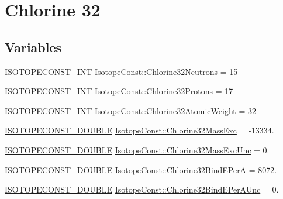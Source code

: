 \hypertarget{group___isotope_const-_chlorine-_cl32}{}\section{Chlorine 32}
\label{group___isotope_const-_chlorine-_cl32}
\subsection*{Variables}
\begin{DoxyCompactItemize}
\item 
\mbox{\hyperlink{group___isotope_const-_macros_ga5f18360b3e99483a35c32d789e62621c}{I\+S\+O\+T\+O\+P\+E\+C\+O\+N\+S\+T\+\_\+\+I\+NT}} \mbox{\hyperlink{group___isotope_const-_chlorine-_cl32_gaa510b219bcdb841beaa3e74ac83097da}{Isotope\+Const\+::\+Chlorine32\+Neutrons}} = 15
\item 
\mbox{\hyperlink{group___isotope_const-_macros_ga5f18360b3e99483a35c32d789e62621c}{I\+S\+O\+T\+O\+P\+E\+C\+O\+N\+S\+T\+\_\+\+I\+NT}} \mbox{\hyperlink{group___isotope_const-_chlorine-_cl32_ga85bfe63dac24c281ec33a5bd34ea1083}{Isotope\+Const\+::\+Chlorine32\+Protons}} = 17
\item 
\mbox{\hyperlink{group___isotope_const-_macros_ga5f18360b3e99483a35c32d789e62621c}{I\+S\+O\+T\+O\+P\+E\+C\+O\+N\+S\+T\+\_\+\+I\+NT}} \mbox{\hyperlink{group___isotope_const-_chlorine-_cl32_ga48b4ad7d2418069cfed40b588e68d7d4}{Isotope\+Const\+::\+Chlorine32\+Atomic\+Weight}} = 32
\item 
\mbox{\hyperlink{group___isotope_const-_macros_ga8f45a7272ce02c0b4c65c44636ed719a}{I\+S\+O\+T\+O\+P\+E\+C\+O\+N\+S\+T\+\_\+\+D\+O\+U\+B\+LE}} \mbox{\hyperlink{group___isotope_const-_chlorine-_cl32_ga31c8ce0d59419cb5f600c756db2f067e}{Isotope\+Const\+::\+Chlorine32\+Mass\+Exc}} = -\/13334.
\item 
\mbox{\hyperlink{group___isotope_const-_macros_ga8f45a7272ce02c0b4c65c44636ed719a}{I\+S\+O\+T\+O\+P\+E\+C\+O\+N\+S\+T\+\_\+\+D\+O\+U\+B\+LE}} \mbox{\hyperlink{group___isotope_const-_chlorine-_cl32_ga4a12fdb736125decae2b78998e480fba}{Isotope\+Const\+::\+Chlorine32\+Mass\+Exc\+Unc}} = 0.
\item 
\mbox{\hyperlink{group___isotope_const-_macros_ga8f45a7272ce02c0b4c65c44636ed719a}{I\+S\+O\+T\+O\+P\+E\+C\+O\+N\+S\+T\+\_\+\+D\+O\+U\+B\+LE}} \mbox{\hyperlink{group___isotope_const-_chlorine-_cl32_gaf539510dd969758a2959fa1eb339768f}{Isotope\+Const\+::\+Chlorine32\+Bind\+E\+PerA}} = 8072.
\item 
\mbox{\hyperlink{group___isotope_const-_macros_ga8f45a7272ce02c0b4c65c44636ed719a}{I\+S\+O\+T\+O\+P\+E\+C\+O\+N\+S\+T\+\_\+\+D\+O\+U\+B\+LE}} \mbox{\hyperlink{group___isotope_const-_chlorine-_cl32_ga4d5a3101afc2d9f1379f40eec4b5ea49}{Isotope\+Const\+::\+Chlorine32\+Bind\+E\+Per\+A\+Unc}} = 0.

\end{DoxyCompactItemize}
